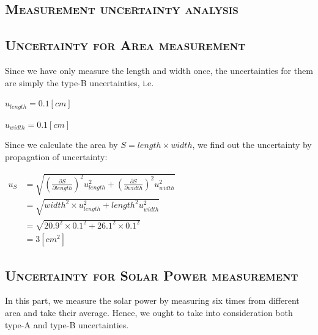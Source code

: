 \documentclass[a4paper,12pt]{article}
\begin{document}

\begin{appendices} 
\section{\textsc{Measurement uncertainty analysis}} 
\subsection{\textsc{Uncertainty for Area measurement}}
Since we have only measure the length and width once, the uncertainties for them are simply the type-B uncertainties, i.e.
\begin{center}
$ u_{length} = 0.1 [cm] $
\end{center}
\begin{center}
$ u_{width} =0.1 [cm] $
\end{center}
Since we calculate the area by $ \displaystyle S = length \times width $, we find out the uncertainty by propagation of uncertainty:
\begin{center}
$\begin{aligned}
 \displaystyle u_S & = \sqrt{\left(\frac{\partial S}{\partial length}\right)^2u_{length}^2 + \left(\frac{\partial S}{\partial width}\right)^2u_{width}^2} \\
 							& = \sqrt{width^2\times u_{length}^2 + length^2 u_{width}^2} \\
 							& = \sqrt{20.9^2\times 0.1^2 + 26.1^2 \times 0.1^2}\\
 							& = 3 [cm^2]
 \end{aligned}$
\end{center}

\subsection{\textsc{Uncertainty for Solar Power measurement}}
In this part, we measure the solar power by measuring six times from different area and take their average. Hence, we ought to take into consideration both type-A and type-B uncertainties. 

\end{appendices}
\end{document}
